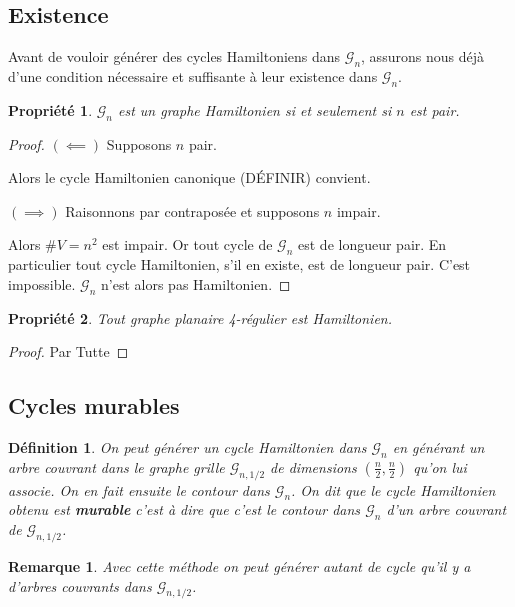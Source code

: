 \documentclass[french,a4paper]{article}
\newtheorem{definition}{Définition}[section]
\newtheorem{property}{Propriété}[section]
\newtheorem{proof}{Preuve}[section]
\newtheorem{remark}{Remarque}[section]
\begin{document}
\subsection{Existence}

Avant de vouloir générer des cycles Hamiltoniens dans $\mathcal{G}_n$, assurons nous déjà d'une condition nécessaire et suffisante à leur existence dans $\mathcal{G}_n$.

\begin{property}
$\mathcal{G}_n$ est un graphe Hamiltonien si et seulement si $n$ est pair.
\end{property}

\begin{proof}
$(\impliedby)$ Supposons $n$ pair.

Alors le cycle Hamiltonien canonique (DÉFINIR) convient.

\medskip

$(\implies)$ Raisonnons par contraposée et supposons $n$ impair.

Alors $\#V=n^2$ est impair. Or tout cycle de $\mathcal{G}_n$ est de longueur pair. En particulier tout cycle Hamiltonien, s'il en existe, est de longueur pair. C'est impossible. $\mathcal{G}_n$ n'est alors pas Hamiltonien.
\end{proof}

\begin{property}
Tout graphe planaire 4-régulier est Hamiltonien.
\end{property}

\begin{proof}
Par Tutte
\end{proof}

\subsection{Cycles murables}

\begin{definition}
On peut générer un cycle Hamiltonien dans $\mathcal{G}_n$ en générant un arbre couvrant dans le graphe grille $\mathcal{G}_{n,1/2}$ de dimensions $(\frac{n}{2},\frac{n}{2})$ qu'on lui associe. On en fait ensuite le contour dans  $\mathcal{G}_n$. On dit que le cycle Hamiltonien obtenu est \textbf{murable} c'est à dire que c'est le contour dans  $\mathcal{G}_n$ d'un arbre couvrant de $\mathcal{G}_{n,1/2}$.
\end{definition}

\begin{remark}
Avec cette méthode on peut générer autant de cycle qu'il y a d'arbres couvrants dans $\mathcal{G}_{n,1/2}$.
\end{remark}
\end{document}
